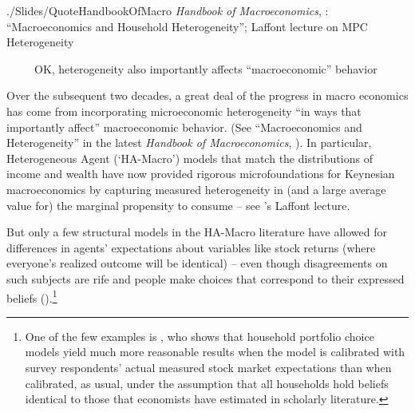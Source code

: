 \begin{verbatimwrite}{./Slides/QuoteHandbookOfMacro}
  \textit{Handbook of Macroeconomics}, \cite{kmpHandbook}: ``Macroeconomics and Household Heterogeneity'';  \cite{violante_marginal_2021} Laffont lecture on MPC Heterogeneity

  \pause \indent ~~~~~OK, heterogeneity also importantly affects ``macroeconomic'' behavior

\end{verbatimwrite}

Over the subsequent two decades, a great deal of the progress in macro economics has come from incorporating microeconomic heterogeneity ``in ways that importantly affect'' macroeconomic behavior.  (See ``Macroeconomics and Heterogeneity'' in the latest \textit{Handbook of Macroeconomics}, \cite{kmpHandbook}).  In particular, Heterogeneous Agent  (`HA-Macro') models that match the distributions of income and wealth have now provided rigorous microfoundations for Keynesian macroeconomics by capturing measured heterogeneity in (and a large average value for) the marginal propensity to consume -- see \cite{violante_marginal_2021}'s Laffont lecture.


But only a few structural models in the HA-Macro literature have allowed for differences in agents' expectations about variables like stock returns (where everyone's realized outcome will be identical) -- even though disagreements on such subjects are rife and people make choices that correspond to their expressed beliefs (\cite{gmsuBeliefs}).\footnote{One of the few examples is \cite{Velasquez2022}, who shows that household portfolio choice models yield much more reasonable results when the model is calibrated with survey respondents' actual measured stock market expectations than when calibrated, as usual, under the assumption that all households hold beliefs identical to those that economists have estimated in scholarly literature.}

